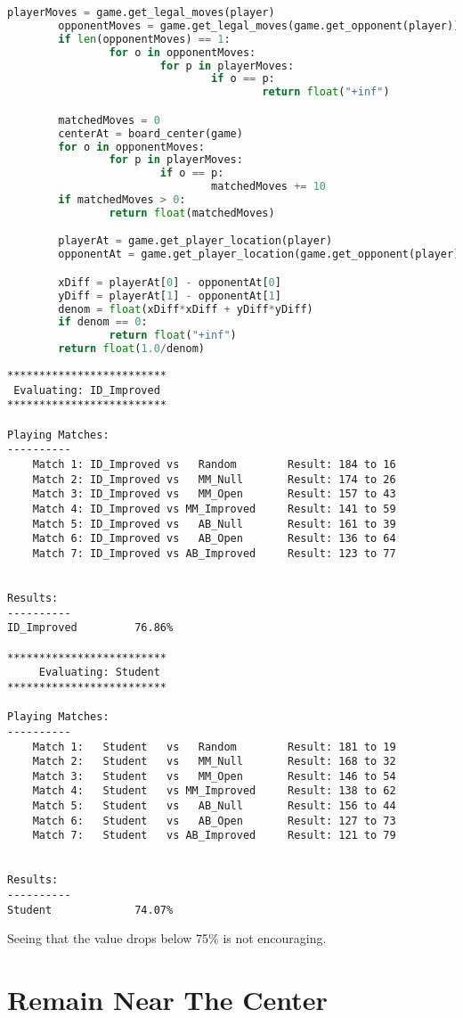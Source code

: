 \documentclass[10pt, a4paper]{article}
\begin{document}
\begin{lstlisting}[language=Python]
		playerMoves = game.get_legal_moves(player)
		opponentMoves = game.get_legal_moves(game.get_opponent(player))
		if len(opponentMoves) == 1:
				for o in opponentMoves:
						for p in playerMoves:
								if o == p:
										return float("+inf")

		matchedMoves = 0
		centerAt = board_center(game)
		for o in opponentMoves:
				for p in playerMoves:
						if o == p:
								matchedMoves += 10
		if matchedMoves > 0:
				return float(matchedMoves)

		playerAt = game.get_player_location(player)
		opponentAt = game.get_player_location(game.get_opponent(player))

		xDiff = playerAt[0] - opponentAt[0]
		yDiff = playerAt[1] - opponentAt[1]
		denom = float(xDiff*xDiff + yDiff*yDiff)
		if denom == 0:
				return float("+inf")
		return float(1.0/denom)
\end{lstlisting}

\begin{verbatim}
*************************
 Evaluating: ID_Improved 
*************************

Playing Matches:
----------
	Match 1: ID_Improved vs   Random    	Result: 184 to 16
	Match 2: ID_Improved vs   MM_Null   	Result: 174 to 26
	Match 3: ID_Improved vs   MM_Open   	Result: 157 to 43
	Match 4: ID_Improved vs MM_Improved 	Result: 141 to 59
	Match 5: ID_Improved vs   AB_Null   	Result: 161 to 39
	Match 6: ID_Improved vs   AB_Open   	Result: 136 to 64
	Match 7: ID_Improved vs AB_Improved 	Result: 123 to 77


Results:
----------
ID_Improved         76.86%

*************************
	 Evaluating: Student   
*************************

Playing Matches:
----------
	Match 1:   Student   vs   Random    	Result: 181 to 19
	Match 2:   Student   vs   MM_Null   	Result: 168 to 32
	Match 3:   Student   vs   MM_Open   	Result: 146 to 54
	Match 4:   Student   vs MM_Improved 	Result: 138 to 62
	Match 5:   Student   vs   AB_Null   	Result: 156 to 44
	Match 6:   Student   vs   AB_Open   	Result: 127 to 73
	Match 7:   Student   vs AB_Improved 	Result: 121 to 79


Results:
----------
Student             74.07%
\end{verbatim}

Seeing that the value drops below 75\% is not encouraging.

\section{Remain Near The Center}
\end{document}
